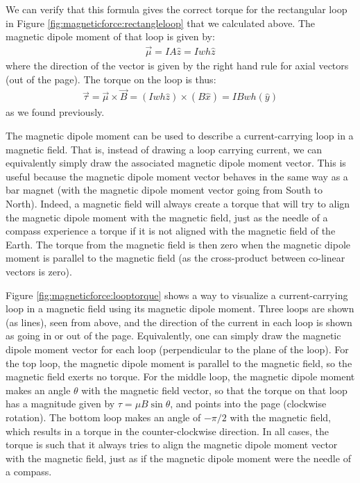 We can verify that this formula gives the correct torque for the rectangular loop in Figure \ref{fig:magneticforce:rectangleloop} that we calculated above. The magnetic dipole moment of that loop is given by:
\begin{align*}
\vec \mu = IA \hat z = Iwh\hat z
\end{align*}
where the direction of the vector is given by the right hand rule for axial vectors (out of the page). The torque on the loop is thus:
\begin{align*}
\vec \tau = \vec \mu \times \vec B = (Iwh\hat z) \times (B\hat x) = IBwh (\hat y)
\end{align*}
as we found previously.

The magnetic dipole moment can be used to describe a current-carrying loop in a magnetic field. That is, instead of drawing a loop carrying current, we can equivalently simply draw the associated magnetic dipole moment vector. This is useful because the magnetic dipole moment vector behaves in the same way as a bar magnet (with the magnetic dipole moment vector going from South to North). Indeed, a magnetic field will always create a torque that will try to align the magnetic dipole moment with the magnetic field, just as the needle of a compass experience a torque if it is not aligned with the magnetic field of the Earth. The torque from the magnetic field is then zero when the magnetic dipole moment is parallel to the magnetic field (as the cross-product between co-linear vectors is zero). 

Figure \ref{fig:magneticforce:looptorque} shows a way to visualize a current-carrying loop in a magnetic field using its magnetic dipole moment.  
Three loops are shown (as lines), seen from above, and the direction of the current in each loop is shown as going in or out of the page. Equivalently, one can simply draw the magnetic dipole moment vector for each loop (perpendicular to the plane of the loop). For the top loop, the magnetic dipole moment is parallel to the magnetic field, so the magnetic field exerts no torque. For the middle loop, the magnetic dipole moment makes an angle $\theta$ with the magnetic field vector, so that the torque on that loop has a magnitude given by $\tau=\mu B \sin\theta$, and points into the page (clockwise rotation). The bottom loop makes an angle of $-\pi/2$ with the magnetic field, which results in a torque in the counter-clockwise direction. In all cases, the torque is such that it always tries to align the magnetic dipole moment vector with the magnetic field, just as if the magnetic dipole moment were the needle of a compass. 

